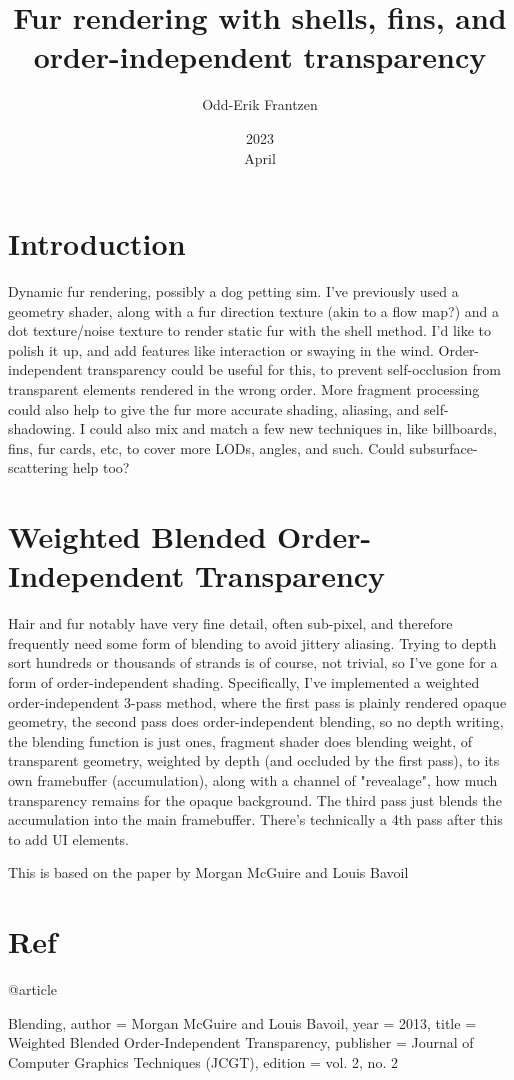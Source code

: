 \documentclass[a4paper, 12pt]{article}
\title{Fur rendering with shells, fins, and order-independent transparency}
\date{2023\\ April}
\author{Odd-Erik Frantzen}
\begin{document}
    \maketitle
    \section{Introduction}
    Dynamic fur rendering, possibly a dog petting sim.
    I've previously used a geometry shader,
    along with a fur direction texture (akin to a flow map?) and a dot texture/noise texture to render static fur with the shell method.
    I'd like to polish it up, and add features like interaction or swaying in the wind.
    Order-independent transparency could be useful for this, to prevent self-occlusion from transparent elements rendered in the wrong order.
    More fragment processing could also help to give the fur more accurate shading, aliasing, and self-shadowing.
    I could also mix and match a few new techniques in, like billboards, fins, fur cards, etc, to cover more LODs, angles, and such.
    Could subsurface-scattering help too?

    \section{Weighted Blended Order-Independent Transparency}

    Hair and fur notably have very fine detail, often sub-pixel,
    and therefore frequently need some form of blending to avoid jittery aliasing.
    Trying to depth sort hundreds or thousands of strands is of course, not trivial,
    so I've gone for a form of order-independent shading.
    Specifically, I've implemented a weighted order-independent 3-pass method,
    where the first pass is plainly rendered opaque geometry,
    the second pass does order-independent blending,
    so no depth writing,
    the blending function is just ones, fragment shader does blending weight,
    of transparent geometry,
    weighted by depth (and occluded by the first pass),
    to its own framebuffer (accumulation),
    along with a channel of "revealage", how much transparency remains for the opaque background.
    The third pass just blends the accumulation into the main framebuffer.
    There's technically a 4th pass after this to add UI elements.

    This is based on the paper by Morgan McGuire and Louis Bavoil~\cite{Blending}


    \section{Ref}
    @article{Blending,
    author = {Morgan McGuire and Louis Bavoil},
    year = {2013},
    title = {Weighted Blended Order-Independent Transparency},
    publisher = {Journal of Computer Graphics Techniques (JCGT)},
    edition = {vol. 2, no. 2}

    }
\end{document}
